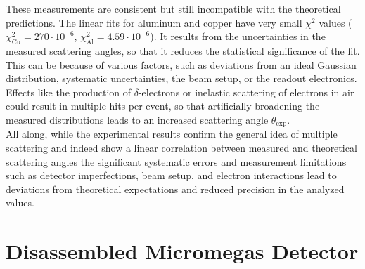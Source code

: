 \documentclass[sn-mathphys-num,iicol]{sn-jnl}
\theoremstyle{thmstyleone}
\theoremstyle{thmstyletwo}
\theoremstyle{thmstylethree}
\begin{document}
These measurements are consistent but still incompatible with the theoretical predictions.
The linear fits for aluminum and copper have very small \(\chi^2\) values (\(\chi^2_{\text{Cu}} = 270 \cdot 10^{-6}\), \(\chi^2_{\text{Al}} = 4.59 \cdot 10^{-6}\)). 
It results from the uncertainties in the measured scattering angles, so that it reduces the statistical significance of the fit. 
This can be because of various factors, such as deviations from an ideal Gaussian distribution, systematic uncertainties, the beam setup, or the readout electronics. 
Effects like the production of \(\delta\)-electrons or inelastic scattering of electrons in air could result in multiple hits per event, so that artificially broadening the measured distributions leads to an increased scattering angle \(\theta_{\text{exp}}\).
\\
All along, while the experimental results confirm the general idea of multiple scattering and indeed show a linear correlation between measured 
and theoretical scattering angles the significant systematic errors and measurement limitations such as detector imperfections, beam setup, 
and electron interactions lead to deviations from theoretical expectations and reduced precision in the analyzed values. 

\clearpage\appendix\onecolumn


\section{Disassembled Micromegas Detector}
\renewcommand{\thefigure}{\Alph{section}\arabic{figure}}
\setcounter{figure}{0}
\renewcommand{\thetable}{\Alph{section}\arabic{table}}
\setcounter{table}{0}
\end{document}
